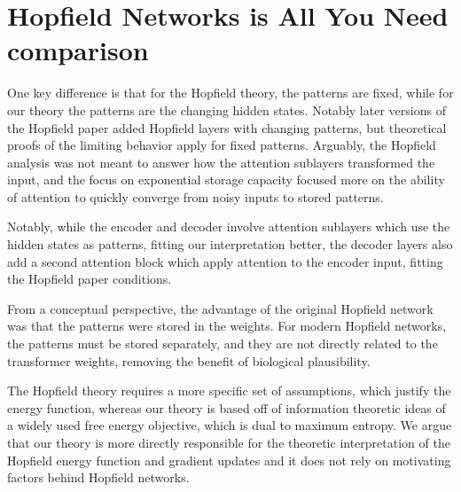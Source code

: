 \documentclass{article}
\begin{document}
\printAffiliationsAndNotice{\icmlEqualContribution} %





\appendix
\section{Hopfield Networks is All You Need comparison}
\label{hniayn}

One key difference is that for the Hopfield theory, the patterns are fixed, while for our theory the patterns are the changing hidden states. Notably later versions of the Hopfield paper added Hopfield layers with changing patterns, but theoretical proofs of the limiting behavior apply for fixed patterns. Arguably, the Hopfield analysis was not meant to answer how the attention sublayers transformed the input, and the focus on exponential storage capacity focused more on the ability of attention to quickly converge from noisy inputs to stored patterns.

Notably, while the encoder and decoder involve attention sublayers which use the hidden states as patterns, fitting our interpretation better, the decoder layers also add a second attention block which apply attention to the encoder input, fitting the Hopfield paper conditions.

From a conceptual perspective, the advantage of the original Hopfield network was that the patterns were stored in the weights. For modern Hopfield networks, the patterns must be stored separately, and they are not directly related to the transformer weights, removing the benefit of biological plausibility. 

The Hopfield theory requires a more specific set of assumptions, which justify the energy function, whereas our theory is based off of information theoretic ideas of a widely used free energy objective, which is dual to maximum entropy. We argue that our theory is more directly responsible for the theoretic interpretation of the Hopfield energy function and gradient updates and it does not rely on motivating factors behind Hopfield networks.
\end{document}

